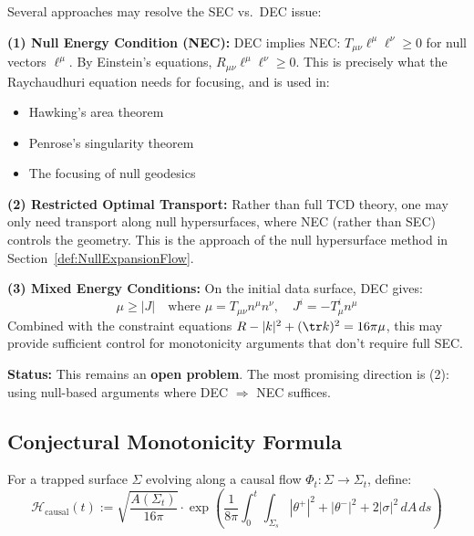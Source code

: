 \begin{remark}\label{rem:EnergyConditionResolution}
Several approaches may resolve the SEC vs.\ DEC issue:

\textbf{(1) Null Energy Condition (NEC):} DEC implies NEC: $T_{\mu\nu}\ell^\mu \ell^\nu \geq 0$ for null vectors $\ell^\mu$. By Einstein's equations, $R_{\mu\nu}\ell^\mu \ell^\nu \geq 0$. This is precisely what the Raychaudhuri equation needs for focusing, and is used in:
\begin{itemize}
    \item Hawking's area theorem
    \item Penrose's singularity theorem
    \item The focusing of null geodesics
\end{itemize}

\textbf{(2) Restricted Optimal Transport:} Rather than full TCD theory, one may only need transport along null hypersurfaces, where NEC (rather than SEC) controls the geometry. This is the approach of the null hypersurface method in Section~\ref{def:NullExpansionFlow}.

\textbf{(3) Mixed Energy Conditions:} On the initial data surface, DEC gives:
\begin{equation}
    \mu \geq |J| \quad \text{where } \mu = T_{\mu\nu}n^\mu n^\nu, \quad J^i = -T^i_\mu n^\mu
\end{equation}
Combined with the constraint equations $R - |k|^2 + (\tr k)^2 = 16\pi \mu$, this may provide sufficient control for monotonicity arguments that don't require full SEC.

\textbf{Status:} This remains an \textbf{open problem}. The most promising direction is (2): using null-based arguments where DEC $\Rightarrow$ NEC suffices.
\end{remark}

\subsection{Conjectural Monotonicity Formula}

\begin{definition}\label{def:CausalHawking}
For a trapped surface $\Sigma$ evolving along a causal flow $\Phi_t: \Sigma \to \Sigma_t$, define:
\begin{equation}
    \mathcal{H}_{\text{causal}}(t) := \sqrt{\frac{A(\Sigma_t)}{16\pi}} \cdot \exp\left( \frac{1}{8\pi} \int_0^t \int_{\Sigma_s} |\theta^+|^2 + |\theta^-|^2 + 2|\sigma|^2 \, dA \, ds \right)
\end{equation}
\end{definition}

